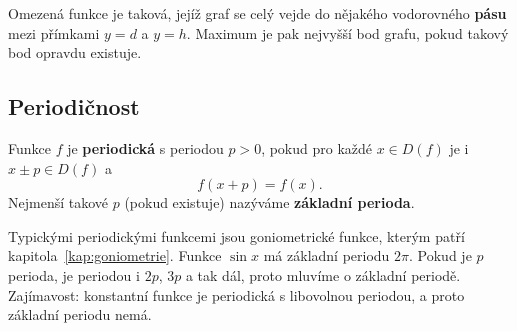 Omezená funkce je taková, jejíž graf se celý vejde do nějakého vodorovného \textbf{pásu} mezi přímkami $y = d$ a $y = h$. Maximum je pak nejvyšší bod grafu, pokud takový bod opravdu existuje.

\begin{center}
\end{center}

\subsection{Periodičnost}\label{sec:periodicnost}

\begin{definitionbox}
  Funkce $f$ je \textbf{periodická} s periodou $p > 0$, pokud pro každé $x\in D(f)$ je i $x\pm p\in D(f)$ a
  \begin{equation*}
    f(x + p) = f(x).
  \end{equation*}
  Nejmenší takové $p$ (pokud existuje) nazýváme \textbf{základní perioda}.
\end{definitionbox}

Typickými periodickými funkcemi jsou goniometrické funkce, kterým patří kapitola~\ref{kap:goniometrie}. Funkce $\sin x$ má základní periodu $2\pi$. Pokud je $p$ perioda, je periodou i $2p$, $3p$ a tak dál, proto mluvíme o základní periodě. Zajímavost: konstantní funkce je periodická s libovolnou periodou, a proto základní periodu nemá.

